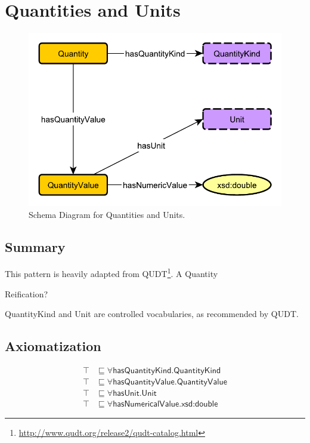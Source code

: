 \section{Quantities and Units}
\label{sec:Quantities}
\begin{figure}[h!]
\begin{center}
\includegraphics[width=.7\textwidth]{figures/quantities}
\end{center}
\caption{Schema Diagram for Quantities and Units.}
\label{fig:Quantities}
\end{figure}
\subsection{Summary}
\label{sum:Quantities}
This pattern is heavily adapted from QUDT\footnote{\url{http://www.qudt.org/release2/qudt-catalog.html}}. A \textsf{Quantity} 

Reification?

\textsf{QuantityKind} and \textsf{Unit} are controlled vocabularies, as recommended by QUDT. \cite{momtut}

\subsection{Axiomatization}
\label{axs:Quantities}
\begin{align}
\top &\sqsubseteq \forall \textsf{hasQuantityKind.QuantityKind} \\
\top &\sqsubseteq \forall \textsf{hasQuantityValue.QuantityValue} \\
\top &\sqsubseteq \forall \textsf{hasUnit.Unit} \\
\top &\sqsubseteq \forall \textsf{hasNumericalValue.xsd:double}
\end{align}

